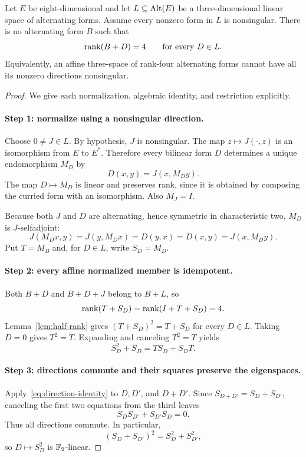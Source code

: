 \begin{theorem}\label{thm:affine-obstruction}
Let $E$ be eight-dimensional and let $L\subseteq\operatorname{Alt}(E)$ be a three-dimensional linear space of alternating forms. Assume every nonzero form in $L$ is nonsingular. There is no alternating form $B$ such that
\[
\operatorname{rank}(B+D)=4\qquad\text{for every }D\in L.
\]
Equivalently, an affine three-space of rank-four alternating forms cannot have all its nonzero directions nonsingular.
\end{theorem}
\begin{proof}
We give each normalization, algebraic identity, and restriction explicitly.

\paragraph{Step 1: normalize using a nonsingular direction.}
Choose $0\ne J\in L$. By hypothesis, $J$ is nonsingular. The map $z\mapsto J(\cdot,z)$ is an isomorphism from $E$ to $E^*$. Therefore every bilinear form $D$ determines a unique endomorphism $M_D$ by
\begin{equation}\label{eq:normalization-form}
D(x,y)=J(x,M_Dy).
\end{equation}
The map $D\mapsto M_D$ is linear and preserves rank, since it is obtained by composing the curried form with an isomorphism. Also $M_J=I$.

Because both $J$ and $D$ are alternating, hence symmetric in characteristic two, $M_D$ is $J$-selfadjoint:
\[
J(M_Dx,y)=J(y,M_Dx)=D(y,x)=D(x,y)=J(x,M_Dy).
\]
Put $T=M_B$ and, for $D\in L$, write $S_D=M_D$.

\paragraph{Step 2: every affine normalized member is idempotent.}
Both $B+D$ and $B+D+J$ belong to $B+L$, so
\[
\operatorname{rank}(T+S_D)=\operatorname{rank}(I+T+S_D)=4.
\]
Lemma~\ref{lem:half-rank} gives $(T+S_D)^2=T+S_D$ for every $D\in L$. Taking $D=0$ gives $T^2=T$. Expanding and canceling $T^2=T$ yields
\begin{equation}\label{eq:direction-identity}
S_D^2+S_D=TS_D+S_DT.
\end{equation}

\paragraph{Step 3: directions commute and their squares preserve the eigenspaces.}
Apply~\eqref{eq:direction-identity} to $D,D'$, and $D+D'$. Since $S_{D+D'}=S_D+S_{D'}$, canceling the first two equations from the third leaves
\[
S_DS_{D'}+S_{D'}S_D=0.
\]
Thus all directions commute. In particular,
\[
(S_D+S_{D'})^2=S_D^2+S_{D'}^2,
\]
so $D\mapsto S_D^2$ is $\mathbb F_2$-linear.


\end{proof}
